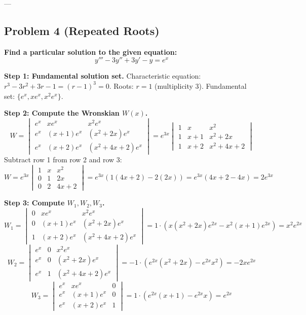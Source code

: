 \documentclass[12pt]{article}
\begin{document}
---

\subsection{Problem 4 (Repeated Roots)}
\textbf{Find a particular solution to the given equation:}
\[ y''' - 3y'' + 3y' - y = e^x \]

\textbf{Step 1: Fundamental solution set.}
Characteristic equation: $r^3 - 3r^2 + 3r - 1 = (r-1)^3 = 0$.
Roots: $r=1$ (multiplicity 3).
Fundamental set: $\{e^x, x e^x, x^2 e^x\}$.

\textbf{Step 2: Compute the Wronskian $W(x)$.}
\[ W = \begin{vmatrix} e^x & x e^x & x^2 e^x \\ e^x & (x+1)e^x & (x^2+2x)e^x \\ e^x & (x+2)e^x & (x^2+4x+2)e^x \end{vmatrix} = e^{3x} \begin{vmatrix} 1 & x & x^2 \\ 1 & x+1 & x^2+2x \\ 1 & x+2 & x^2+4x+2 \end{vmatrix} \]
Subtract row 1 from row 2 and row 3:
\[ W = e^{3x} \begin{vmatrix} 1 & x & x^2 \\ 0 & 1 & 2x \\ 0 & 2 & 4x+2 \end{vmatrix} = e^{3x} (1(4x+2) - 2(2x)) = e^{3x}(4x+2-4x) = 2e^{3x} \]

\textbf{Step 3: Compute $W_1, W_2, W_3$.}
\[ W_1 = \begin{vmatrix} 0 & x e^x & x^2 e^x \\ 0 & (x+1)e^x & (x^2+2x)e^x \\ 1 & (x+2)e^x & (x^2+4x+2)e^x \end{vmatrix} = 1 \cdot (x(x^2+2x)e^{2x} - x^2(x+1)e^{2x}) = x^2 e^{2x} \]
\[ W_2 = \begin{vmatrix} e^x & 0 & x^2 e^x \\ e^x & 0 & (x^2+2x)e^x \\ e^x & 1 & (x^2+4x+2)e^x \end{vmatrix} = -1 \cdot (e^{2x}(x^2+2x) - e^{2x}x^2) = -2x e^{2x} \]
\[ W_3 = \begin{vmatrix} e^x & x e^x & 0 \\ e^x & (x+1)e^x & 0 \\ e^x & (x+2)e^x & 1 \end{vmatrix} = 1 \cdot (e^{2x}(x+1) - e^{2x}x) = e^{2x} \]
\end{document}
